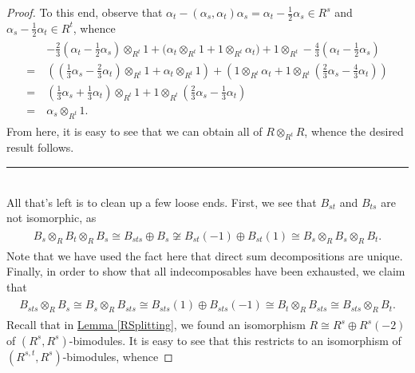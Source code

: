 \begin{proof}
\noindent To this end, observe that $\alpha_t - (\alpha_s, \alpha_t)\alpha_s = \alpha_t - \frac{1}{2}\alpha_s \in R^s$ and $\alpha_s - \frac{1}{2}\alpha_t \in R^t$, whence
\begin{align*}
\begin{split}
&-\frac{2}{3}\left(\alpha_t - \frac{1}{2}\alpha_s\right) \otimes_{R^t} 1 + \bigg(\alpha_t \otimes_{R^t} 1 + 1 \otimes_{R^t} \alpha_t\bigg) + 1 \otimes_{R^t} -\frac{4}{3}\left(\alpha_t - \frac{1}{2}\alpha_s\right)\\
=\ &\left(\left(\frac{1}{3}\alpha_s - \frac{2}{3}\alpha_t\right) \otimes_{R^t} 1 + \alpha_t \otimes_{R^t} 1\right) + \left(1 \otimes_{R^t} \alpha_t + 1 \otimes_{R^t} \left(\frac{2}{3}\alpha_s - \frac{4}{3}\alpha_t\right)\right)\\
=\ &\left(\frac{1}{3}\alpha_s + \frac{1}{3}\alpha_t\right) \otimes_{R^t} 1 + 1 \otimes_{R^t} \left(\frac{2}{3}\alpha_s - \frac{1}{3}\alpha_t\right)\\
=\ &\alpha_s \otimes_{R^t} 1.
\end{split}
\end{align*}
\noindent From here, it is easy to see that we can obtain all of $R \otimes_{R^t} R$, whence the desired result follows.\\[-1.5\baselineskip]
\begin{center}
\rule{0.5\linewidth}{1pt}
\end{center}
\noindent\\[-\baselineskip] All that's left is to clean up a few loose ends. First, we see that $B_{st}$ and $B_{ts}$ are not isomorphic, as
\begin{align*}
\begin{split}
B_s \otimes_R B_t \otimes_R B_s \cong B_{sts} \oplus B_s \not\cong B_{st}(-1) \oplus B_{st}(1) \cong B_s \otimes_R B_s \otimes_R B_t.
\end{split}
\end{align*}
\noindent Note that we have used the fact here that direct sum decompositions are unique. Finally, in order to show that all indecomposables have been exhausted, we claim that
\begin{align*}
\begin{split}
B_{sts} \otimes_R B_s \cong B_s \otimes_R B_{sts} \cong B_{sts}(1) \oplus B_{sts}(-1) \cong B_t \otimes_R B_{sts} \cong B_{sts} \otimes_R B_t.
\end{split}
\end{align*}
\noindent Recall that in \hyperref[RSplitting]{Lemma \ref*{RSplitting}}, we found an isomorphism $R \cong R^s \oplus R^s(-2)$ of $(R^s, R^s)$-bimodules. It is easy to see that this restricts to an isomorphism of $(R^{s,t}, R^s)$-bimodules, whence

\end{proof}
